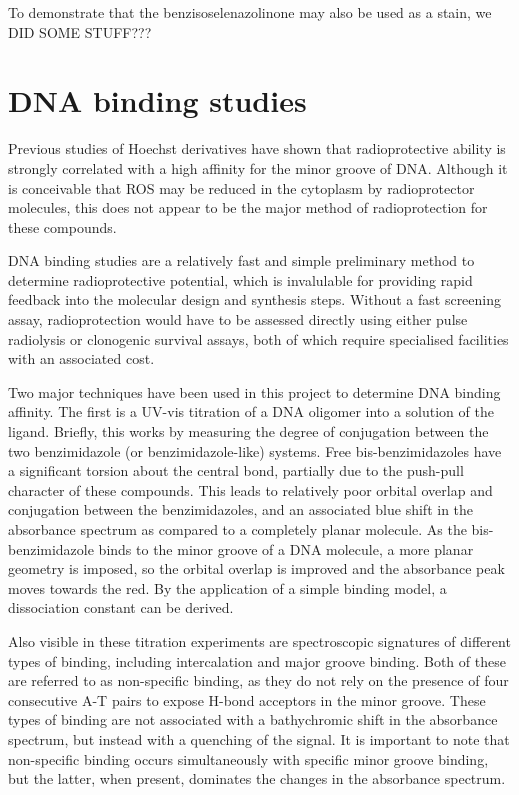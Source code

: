 \begin{refsection}
To demonstrate that the benzisoselenazolinone  may also be used as a stain, we DID SOME STUFF???



\section{DNA binding studies}
Previous studies of Hoechst derivatives have shown that radioprotective ability is strongly correlated with a high affinity for the minor groove of DNA.
Although it is conceivable that ROS may be reduced in the cytoplasm by radioprotector molecules, this does not appear to be the major method of radioprotection for these compounds.

DNA binding studies are a relatively fast and simple preliminary method to determine radioprotective potential, which is invalulable for providing rapid feedback into the molecular design and synthesis steps.
Without a fast screening assay, radioprotection would have to be assessed directly using either pulse radiolysis or clonogenic survival assays, both of which require specialised facilities with an associated cost.

\label{sec:absorbance}
Two major techniques have been used in this project to determine DNA binding affinity.
The first is a UV-vis titration of a DNA oligomer into a solution of the ligand.
Briefly, this works by measuring the degree of conjugation between the two benzimidazole (or benzimidazole-like) systems.
Free bis-benzimidazoles have a significant torsion about the central bond, partially due to the push-pull character of these compounds.
This leads to relatively poor orbital overlap and conjugation between the benzimidazoles, and an associated blue shift in the absorbance spectrum as compared to a completely planar molecule.
As the bis-benzimidazole binds to the minor groove of a DNA molecule, a more planar geometry is imposed, so the orbital overlap is improved and the absorbance peak moves towards the red.
By the application of a simple binding model, a dissociation constant can be derived.

Also visible in these titration experiments are spectroscopic signatures of different types of binding, including intercalation and major groove binding.
Both of these are referred to as non-specific binding, as they do not rely on the presence of four consecutive A-T pairs to expose H-bond acceptors in the minor groove.
These types of binding are not associated with a bathychromic shift in the absorbance spectrum, but instead with a quenching of the signal.
It is important to note that non-specific binding occurs simultaneously with specific minor groove binding, but the latter, when present, dominates the changes in the absorbance spectrum.


\end{refsection}
